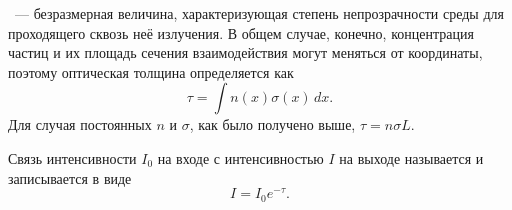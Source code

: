 ~--- безразмерная величина, характеризующая степень непрозрачности среды для проходящего сквозь неё излучения. В общем случае, конечно, концентрация частиц и их площадь сечения взаимодействия могут меняться от координаты, поэтому оптическая толщина определяется как
\begin{equation}
	\tau = \int n(x) \sigma(x)\,dx.
\end{equation}
Для случая постоянных $n$ и $\sigma$, как было получено выше, $\tau = n \sigma L$.

Связь интенсивности $I_0$ на входе с интенсивностью $I$ на выходе называется  и записывается в виде
\begin{equation}
	I = I_0 e^{-\tau}.
\end{equation}



